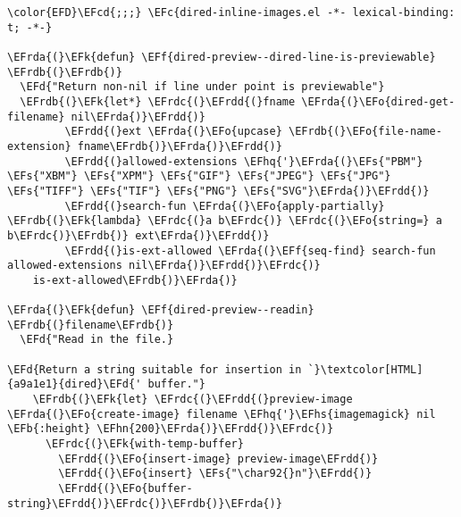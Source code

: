 \documentclass[a4wide,10pt]{article}
\newcommand{\EFc}[1]{\textcolor{EFc}{#1}} %
\newcommand{\EFcd}[1]{\textcolor{EFcd}{#1}} %
\newcommand{\EFs}[1]{\textcolor{EFs}{#1}} %
\newcommand{\EFd}[1]{\textcolor{EFd}{#1}} %
\newcommand{\EFk}[1]{\textcolor{EFk}{#1}} %
\newcommand{\EFb}[1]{\textcolor{EFb}{#1}} %
\newcommand{\EFf}[1]{\textcolor{EFf}{#1}} %
\newcommand{\EFo}[1]{\textcolor{EFo}{#1}} %
\newcommand{\EFhn}[1]{\textcolor{EFhn}{\textbf{#1}}} %
\newcommand{\EFhq}[1]{\textcolor{EFhq}{#1}} %
\newcommand{\EFhs}[1]{\textcolor{EFhs}{#1}} %
\newcommand{\EFrda}[1]{\textcolor{EFrda}{#1}} %
\newcommand{\EFrdb}[1]{\textcolor{EFrdb}{#1}} %
\newcommand{\EFrdc}[1]{\textcolor{EFrdc}{#1}} %
\newcommand{\EFrdd}[1]{\textcolor{EFrdd}{#1}} %
\begin{document}
\begin{Code}
\begin{Verbatim}
\color{EFD}\EFcd{;;;} \EFc{dired-inline-images.el -*- lexical-binding: t; -*-}

\EFrda{(}\EFk{defun} \EFf{dired-preview--dired-line-is-previewable} \EFrdb{(}\EFrdb{)}
  \EFd{"Return non-nil if line under point is previewable"}
  \EFrdb{(}\EFk{let*} \EFrdc{(}\EFrdd{(}fname \EFrda{(}\EFo{dired-get-filename} nil\EFrda{)}\EFrdd{)}
         \EFrdd{(}ext \EFrda{(}\EFo{upcase} \EFrdb{(}\EFo{file-name-extension} fname\EFrdb{)}\EFrda{)}\EFrdd{)}
         \EFrdd{(}allowed-extensions \EFhq{'}\EFrda{(}\EFs{"PBM"} \EFs{"XBM"} \EFs{"XPM"} \EFs{"GIF"} \EFs{"JPEG"} \EFs{"JPG"} \EFs{"TIFF"} \EFs{"TIF"} \EFs{"PNG"} \EFs{"SVG"}\EFrda{)}\EFrdd{)}
         \EFrdd{(}search-fun \EFrda{(}\EFo{apply-partially} \EFrdb{(}\EFk{lambda} \EFrdc{(}a b\EFrdc{)} \EFrdc{(}\EFo{string=} a b\EFrdc{)}\EFrdb{)} ext\EFrda{)}\EFrdd{)}
         \EFrdd{(}is-ext-allowed \EFrda{(}\EFf{seq-find} search-fun allowed-extensions nil\EFrda{)}\EFrdd{)}\EFrdc{)}
    is-ext-allowed\EFrdb{)}\EFrda{)}

\EFrda{(}\EFk{defun} \EFf{dired-preview--readin} \EFrdb{(}filename\EFrdb{)}
  \EFd{"Read in the file.}

\EFd{Return a string suitable for insertion in `}\textcolor[HTML]{a9a1e1}{dired}\EFd{' buffer."}
    \EFrdb{(}\EFk{let} \EFrdc{(}\EFrdd{(}preview-image \EFrda{(}\EFo{create-image} filename \EFhq{'}\EFhs{imagemagick} nil \EFb{:height} \EFhn{200}\EFrda{)}\EFrdd{)}\EFrdc{)}
      \EFrdc{(}\EFk{with-temp-buffer}
        \EFrdd{(}\EFo{insert-image} preview-image\EFrdd{)}
        \EFrdd{(}\EFo{insert} \EFs{"\char92{}n"}\EFrdd{)}
        \EFrdd{(}\EFo{buffer-string}\EFrdd{)}\EFrdc{)}\EFrdb{)}\EFrda{)}


\end{Verbatim}
\end{Code}
\end{document}
